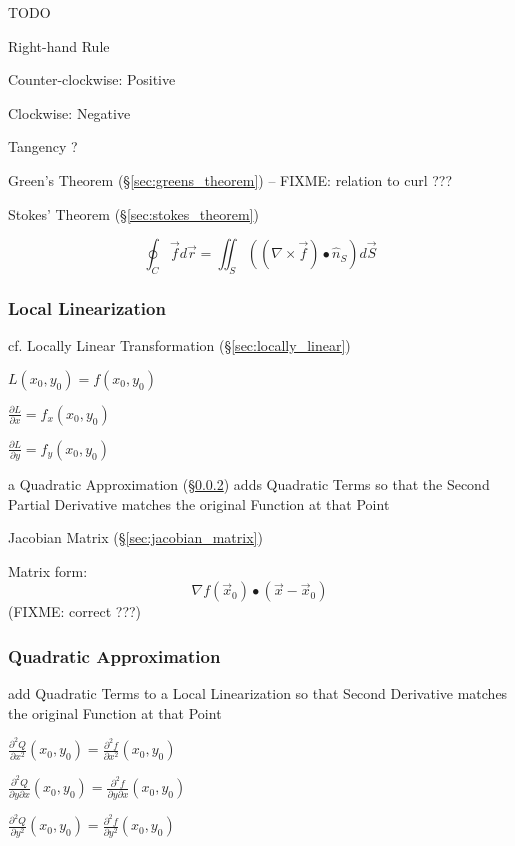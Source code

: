 TODO

Right-hand Rule

Counter-clockwise: Positive

Clockwise: Negative

Tangency ?

Green's Theorem (\S\ref{sec:greens_theorem}) -- FIXME: relation to curl ???

Stokes' Theorem (\S\ref{sec:stokes_theorem})

\[
  \oint_C \vec{f} d\vec{r}
    = \iint_S ((\nabla \times \vec{f}) \bullet \hat{n}_S) d\vec{S}
\]



\subsubsection{Local Linearization}\label{sec:local_linearization}

\fist cf. Locally Linear Transformation (\S\ref{sec:locally_linear})

$L(x_0,y_0) = f(x_0,y_0)$

$\frac{\partial{L}}{\partial{x}} = f_x(x_0,y_0)$

$\frac{\partial{L}}{\partial{y}} = f_y(x_0,y_0)$

a Quadratic Approximation (\S\ref{sec:quadratic_approximation}) adds Quadratic
Terms so that the Second Partial Derivative matches the original Function at
that Point

\fist Jacobian Matrix (\S\ref{sec:jacobian_matrix})

Matrix form:
\[
  \nabla f(\vec{x}_0) \bullet (\vec{x}-\vec{x}_0)
\]
(FIXME: correct ???)



\subsubsection{Quadratic Approximation}\label{sec:quadratic_approximation}

add Quadratic Terms to a Local Linearization so that Second Derivative matches
the original Function at that Point

$\frac{\partial^2{Q}}{\partial{x^2}}(x_0,y_0) =
  \frac{\partial^2{f}}{\partial{x^2}}(x_0,y_0)$

$\frac{\partial^2{Q}}{\partial{y}\partial{x}}(x_0,y_0) =
  \frac{\partial^2{f}}{\partial{y}\partial{x}}(x_0,y_0)$

$\frac{\partial^2{Q}}{\partial{y^2}}(x_0,y_0) =
  \frac{\partial^2{f}}{\partial{y^2}}(x_0,y_0)$

